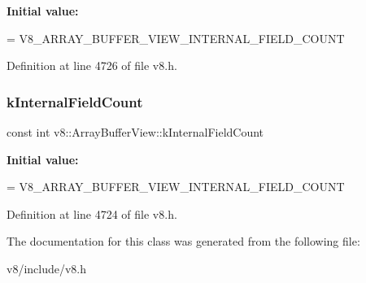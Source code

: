 {\bfseries Initial value\+:}
\begin{DoxyCode}
=
      V8\_ARRAY\_BUFFER\_VIEW\_INTERNAL\_FIELD\_COUNT
\end{DoxyCode}


Definition at line 4726 of file v8.\+h.

\mbox{\label{classv8_1_1ArrayBufferView_a1cccb675b1a91e61411fee5918d451db}} 
\subsubsection{\texorpdfstring{k\+Internal\+Field\+Count}{kInternalFieldCount}}
{\footnotesize\ttfamily const int v8\+::\+Array\+Buffer\+View\+::k\+Internal\+Field\+Count\hspace{0.3cm}{\ttfamily [static]}}

{\bfseries Initial value\+:}
\begin{DoxyCode}
=
      V8\_ARRAY\_BUFFER\_VIEW\_INTERNAL\_FIELD\_COUNT
\end{DoxyCode}


Definition at line 4724 of file v8.\+h.



The documentation for this class was generated from the following file\+:\begin{DoxyCompactItemize}
\item 
v8/include/v8.\+h\end{DoxyCompactItemize}

